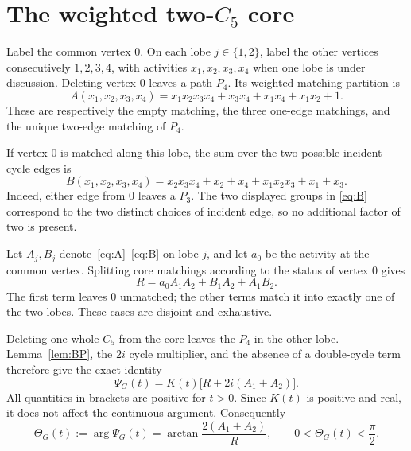 \documentclass[11pt]{article}
\theoremstyle{remark}
\newcommand{\Arg}{\operatorname{arg}}
\begin{document}
\section{The weighted two-$C_5$ core}

Label the common vertex $0$.  On each lobe $j\in\{1,2\}$, label the other
vertices consecutively $1,2,3,4$, with activities $x_1,x_2,x_3,x_4$ when one
lobe is under discussion.  Deleting vertex $0$ leaves a path $P_4$.  Its
weighted matching partition is
\begin{equation}\label{eq:A}
 A(x_1,x_2,x_3,x_4)
 =x_1x_2x_3x_4+x_3x_4+x_1x_4+x_1x_2+1.
\end{equation}
These are respectively the empty matching, the three one-edge matchings, and
the unique two-edge matching of $P_4$.

If vertex $0$ is matched along this lobe, the sum over the two possible
incident cycle edges is
\begin{equation}\label{eq:B}
 B(x_1,x_2,x_3,x_4)
 =x_2x_3x_4+x_2+x_4+x_1x_2x_3+x_1+x_3.
\end{equation}
Indeed, either edge from $0$ leaves a $P_3$.  The two displayed groups in
\eqref{eq:B} correspond to the two distinct choices of incident edge, so no
additional factor of two is present.

Let $A_j,B_j$ denote~\eqref{eq:A}--\eqref{eq:B} on lobe $j$, and let $a_0$
be the activity at the common vertex.  Splitting core matchings according to
the status of vertex $0$ gives
\begin{equation}\label{eq:R}
 R=a_0A_1A_2+B_1A_2+A_1B_2.
\end{equation}
The first term leaves $0$ unmatched; the other terms match it into exactly
one of the two lobes.  These cases are disjoint and exhaustive.

Deleting one whole $C_5$ from the core leaves the $P_4$ in the other lobe.
Lemma~\ref{lem:BP}, the $2i$ cycle multiplier, and the absence of a
double-cycle term therefore give the exact identity
\begin{equation}\label{eq:Psi-factor}
 \boxed{\ \Psi_G(t)=K(t)\bigl[R+2i(A_1+A_2)\bigr].\ }
\end{equation}
All quantities in brackets are positive for $t>0$.  Since $K(t)$ is positive
and real, it does not affect the continuous argument.  Consequently
\begin{equation}\label{eq:Theta-exact}
 \Theta_G(t):=\Arg\Psi_G(t)
 =\arctan\frac{2(A_1+A_2)}R,
 \qquad 0<\Theta_G(t)<\frac\pi2.
\end{equation}
\end{document}

